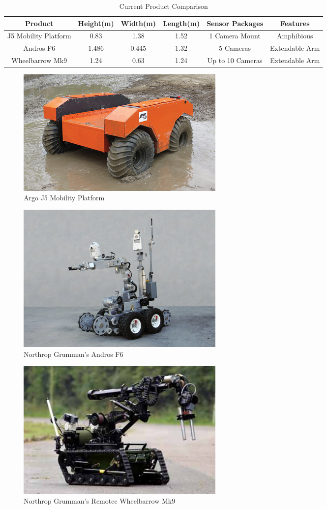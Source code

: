 \begin{table}[H]
\begin{adjustwidth}{-.5in}{-.5in}
\centering
\begin{tabular}{c|c|c|c|c|c}
Product & Height(m) & Width(m) & Length(m) & Sensor Packages & Features\\\hline
J5 Mobility Platform & 0.83 & 1.38 & 1.52 & 1 Camera Mount & Amphibious\\
Andros F6 & 1.486 & 0.445 & 1.32 & 5 Cameras & Extendable Arm \\
Wheelbarrow Mk9 & 1.24 & 0.63 & 1.24 & Up to 10 Cameras & Extendable Arm\\
\end{tabular}
\caption{\label{tab:current} Current Product Comparison}
\end{adjustwidth}
\end{table}

\begin{figure}[H]
\centering
\includegraphics[width=0.5\textwidth]{argo-j5-mobility-platform-2-small-1.jpg}
\caption{Argo J5 Mobility Platform}
\label{fig:ArgoPlatform}
\end{figure}


\begin{figure}[H]
\centering
\includegraphics[width=0.5\textwidth]{NG1.jpg}
\caption{Northrop Grumman's Andros F6}
\label{fig:NorthropAndros}
\end{figure}

\begin{figure}[H]
\centering
\includegraphics[width=0.5\textwidth]{wheelbarrow.jpg}
\caption{Northrop Grumman's Remotec Wheelbarrow Mk9}
\label{fig:NorthropWheelbarrow}
\end{figure}

